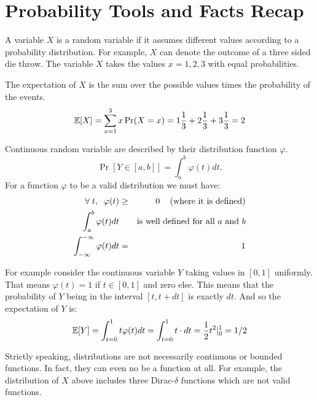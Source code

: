 \documentclass{article}
\begin{document}

\section{Probability Tools and Facts Recap}

A variable $X$ is a random variable if it assumes different values
according to a probability distribution. For example, $X$ can 
denote the outcome of a three sided die throw. 
The variable $X$ takes the values $x = 1,2,3$ with equal probabilities. 

The expectation of $X$ is the sum over the possible values times the probability of the events.
\begin{equation}
{\mathbb E}[X] = \sum_{x=1}^{3}x \Pr(X = x)=
1\frac{1}{3}+2\frac{1}{3}+3\frac{1}{3} = 2
\end{equation}


Continuous random variable are described by their distribution function $\varphi$.
$$
\Pr[Y \in [a,b]] = \int_{a}^{b}\varphi (t) dt.
$$
For a function $\varphi$ to be a valid distribution we must have:
\begin{eqnarray}
\forall \;t, \;\; \varphi(t) &\ge& 0  \mbox{\;\;\; (where it is defined)}\\
\int_{a}^{b}\varphi (t) dt && \mbox{is well defined for all $a$ and $b$}\\
\int_{-\infty}^{-\infty}\varphi (t) dt &=& 1
\end{eqnarray}

For example consider the continuous variable $Y$ taking values in
$[0,1]$ uniformly. That means $\varphi(t) = 1$ if $t \in [0,1]$ and zero else.
This means that the probability of $Y$ being in the interval $[t,t + dt]$ is exactly $dt$. And so the expectation of $Y$ is:
\begin{equation}
{\mathbb E}[Y] = \int_{t=0}^{1}t \varphi(t) dt = \int_{t=0}^{1}t \cdot dt = \frac{1}{2}t^2|_{0}^{1} = 1/2
\end{equation}

\begin{remark}
Strictly speaking, distributions are not necessarily continuous or bounded functions. 
In fact, they can even no be a function at all. 
For example, the distribution of $X$ above includes three Dirac-$\delta$ functions which are not valid functions.
\end{remark}
\end{document}
